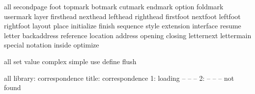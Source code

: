 \startinterface all
    {secondpage}
          {foot}
       {topmark}
       {botmark}
       {cutmark}
       {endmark}
        {option}
      {foldmark}
      {usermark}
         {layer}
     {firsthead}
      {nexthead}
      {lefthead}
     {righthead}
     {firstfoot}
      {nextfoot}
      {leftfoot}
     {rightfoot}
        {layout}
         {place}
    {initialize}
        {finish}
      {sequence}
         {style}
     {extension}
     {interface}
        {resume}
        {letter}
   {backaddress}
     {reference}
      {location}
       {address}
       {opening}
       {closing}
    {letternext}
    {lettermain}
       {special}
      {notation}
        {inside}
      {optimize}
\stopinterface

\startinterface all
         {set}
       {value}
     {complex}
      {simple}
         {use}
      {define}
       {flush}
\stopinterface


\startmessages all library: correspondence
        title: correspondence
            1: loading -- -- --
            2: -- -- -- not found
\stopmessages

